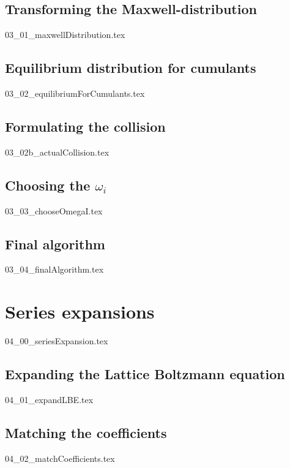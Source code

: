 \documentclass[12pt,a4paper,twoside]{article}
\begin{document}
\subsection{Transforming the Maxwell-distribution}
\label{sub: Transforming the Maxwell-distribution}
{03_01_maxwellDistribution.tex}

\subsection{Equilibrium distribution for cumulants}
\label{sub: Equilibrium distribution for cumulants}
{03_02_equilibriumForCumulants.tex}

\subsection{Formulating the collision}
\label{sub: Formulating the collision}
{03_02b_actualCollision.tex}

\subsection{Choosing the \texorpdfstring{$\omega_i$}{omega i}}
\label{sub: Choosing the omega i}
{03_03_chooseOmegaI.tex}

\subsection{Final algorithm}
\label{sub: Final algorithm}
{03_04_finalAlgorithm.tex}

\section{Series expansions}
\label{sec: Series expansions}
{04_00_seriesExpansion.tex}


\subsection{Expanding the Lattice Boltzmann equation}
\label{sub: Expanding the Lattice Boltzmann equation}
{04_01_expandLBE.tex}

\subsection{Matching the coefficients}
\label{sub: Matching the coefficients}
{04_02_matchCoefficients.tex}
\end{document}
